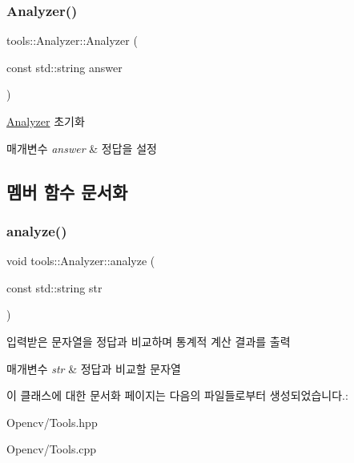 \subsubsection{\texorpdfstring{Analyzer()}{Analyzer()}}
{\footnotesize\ttfamily tools\+::\+Analyzer\+::\+Analyzer (\begin{DoxyParamCaption}\item[{const std\+::string}]{answer }\end{DoxyParamCaption})}



\hyperlink{classtools_1_1_analyzer}{Analyzer} 초기화 


\begin{DoxyParams}{매개변수}
{\em answer} & 정답을 설정 \\
\hline
\end{DoxyParams}


\subsection{멤버 함수 문서화}
\mbox{\label{classtools_1_1_analyzer_abd1e57e10b843dca874e933236363efa}} 
\subsubsection{\texorpdfstring{analyze()}{analyze()}}
{\footnotesize\ttfamily void tools\+::\+Analyzer\+::analyze (\begin{DoxyParamCaption}\item[{const std\+::string}]{str }\end{DoxyParamCaption})}



입력받은 문자열을 정답과 비교하며 통계적 계산 결과를 출력 


\begin{DoxyParams}{매개변수}
{\em str} & 정답과 비교할 문자열 \\
\hline
\end{DoxyParams}


이 클래스에 대한 문서화 페이지는 다음의 파일들로부터 생성되었습니다.\+:\begin{DoxyCompactItemize}
\item 
Opencv/Tools.\+hpp\item 
Opencv/Tools.\+cpp\end{DoxyCompactItemize}
